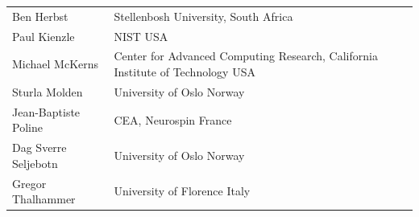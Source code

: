 \begin{tabular}{p{3.7cm}p{}}
Ben Herbst & Stellenbosh University, {\sc South Africa}\\ 
Paul Kienzle & NIST {\sc USA}\\
Michael McKerns & Center for Advanced Computing Research, California
Institute of Technology {\sc
USA}\\
Sturla Molden & University of Oslo {\sc Norway}\\
Jean-Baptiste Poline  &  CEA, Neurospin {\sc France}\\
Dag Sverre Seljebotn & University of Oslo {\sc Norway}\\
Gregor Thalhammer & University of Florence {\sc Italy}\\
\end{tabular}

\pagestyle{fancy}
\resethandings
\cleardoublepage 
\markright{}{}
\markbox{}{}
\pagestyle{fancy}
\resethandings


